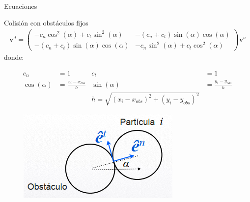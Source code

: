 \begin{frame}{Ecuaciones}
    \begin{block}{Colisión con obstáculos fijos}
        \begin{equation*}
            \begin{aligned}
                \mathbf{v}^{d} = \begin{pmatrix} -c_n \cos^{2}(\alpha) + c_t \sin^{2}(\alpha) & - (c_n + c_t) \sin(\alpha) \cos(\alpha) \\
                - (c_n + c_t) \sin(\alpha) \cos(\alpha) & -c_n \sin^{2}(\alpha) + c_t \cos^{2}(\alpha) \end{pmatrix} \mathbf{v}^{a}
            \end{aligned}\label{eq:equation-particles-collision-obstacle}
        \end{equation*}
        donde:
        \begin{minipage}[t]{0.6\linewidth}
            \begin{equation*}
                \begin{aligned}
                    c_n &= 1 &
                    c_t &= 1 \\
                    \cos(\alpha) &= \frac{x_i - x_{obs}}{h} &
                    \sin(\alpha) &= \frac{y_i - y_{obs}}{h} \\&&
                    h = \sqrt{(x_i - x_{obs})^2 + (y_i - y_{obs})^2}
                \end{aligned}\label{eq:equation-particles-collision-obstacle-variables}
            \end{equation*}
        \end{minipage}
        \hfill
        \begin{minipage}[t]{0.2\linewidth}
            \begin{figure}[H]
                \centering
                \includegraphics[width=0.9\linewidth]{pic/01-intro/obstacle-collision-diagram}\label{fig:figure-obstacle-collision-diagram}
            \end{figure}
        \end{minipage}
    \end{block}

\end{frame}
